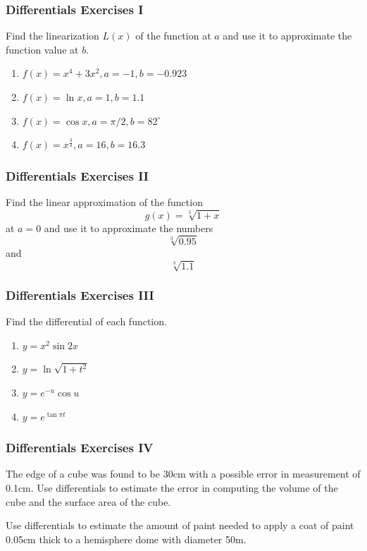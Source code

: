 \documentclass[xcolor=dvipsnames]{beamer}
\begin{document}
\begin{frame}
  \frametitle{Differentials Exercises I}
{\ubung} Find the linearization $L(x)$ of the function at $a$ and
use it to approximate the function value at $b$.
\begin{enumerate}
\item $\displaystyle f(x)=x^{4}+3x^{2},a=-1,b=-0.923$
\item $\displaystyle f(x)=\ln{}x,a=1,b=1.1$
\item $\displaystyle f(x)=\cos{}x,a=\pi/2,b=82^{\circ}$
\item $\displaystyle f(x)=x^{\frac{3}{4}},a=16,b=16.3$
\end{enumerate}
\end{frame}

\begin{frame}
  \frametitle{Differentials Exercises II}
{\ubung} Find the linear approximation of the function 
\begin{equation}
  \label{eq:ceengaet}
g(x)=\sqrt[3]{1+x}
\end{equation}
at $a=0$ and use it to approximate the numbers 
\begin{equation}
  \label{eq:ciaghier}
\sqrt[3]{0.95}
\end{equation}
and
\begin{equation}
  \label{eq:woozahme}
\sqrt[3]{1.1}
\end{equation}
\end{frame}

\begin{frame}
  \frametitle{Differentials Exercises III}
{\ubung} Find the differential of each function.
\begin{enumerate}
\item $\displaystyle y=x^{2}\sin{}2x$ 
\item $\displaystyle y=\ln\sqrt{1+t^{2}}$
\item $\displaystyle y=e^{-u}\cos{}u$
\item $\displaystyle y=e^{\tan\pi{}t}$
\end{enumerate}
\end{frame}

\begin{frame}
  \frametitle{Differentials Exercises IV}
{\ubung} The edge of a cube was found to be 30cm with a possible error
in measurement of 0.1cm. Use differentials to estimate the error in
computing the volume of the cube and the surface area of the cube.

\bigskip

{\ubung} Use differentials to estimate the amount of paint needed to
apply a coat of paint 0.05cm thick to a hemisphere dome with diameter
50m.
\end{frame}
\end{document}
